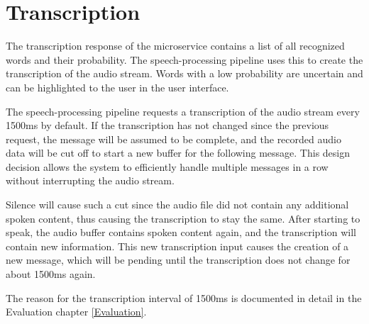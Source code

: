 
\section{Transcription}

The transcription response of the microservice contains a list of all recognized words and their probability. The 
speech-processing pipeline uses this to create the transcription of the audio stream. Words with a low probability are 
uncertain and can be highlighted to the user in the user interface.

The speech-processing pipeline requests a transcription of the audio stream every 1500ms by default. If the 
transcription has not changed since the previous request, the message will be assumed to be complete, and the recorded 
audio data will be cut off to start a new buffer for the following message. This design decision allows the system to 
efficiently handle multiple messages in a row without interrupting the audio stream.

Silence will cause such a cut since the audio file did not contain any additional spoken content, thus causing the 
transcription to stay the same. After starting to speak, the audio buffer contains spoken content again, and the 
transcription will contain new information. This new transcription input causes the creation of a new message, which 
will be pending until the transcription does not change for about 1500ms again.

The reason for the transcription interval of 1500ms is documented in detail in the Evaluation chapter \ref{Evaluation}.
